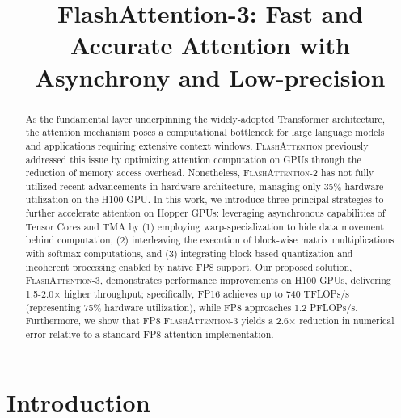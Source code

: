 \title{FlashAttention-3: Fast and Accurate Attention with Asynchrony and Low-precision}

\begin{abstract}
As the fundamental layer underpinning the widely-adopted Transformer architecture, the attention mechanism poses a computational bottleneck for large language models and applications requiring extensive context windows. \textsc{FlashAttention} previously addressed this issue by optimizing attention computation on GPUs through the reduction of memory access overhead. Nonetheless, \textsc{FlashAttention-2} has not fully utilized recent advancements in hardware architecture, managing only 35\% hardware utilization on the H100 GPU. In this work, we introduce three principal strategies to further accelerate attention on Hopper GPUs: leveraging asynchronous capabilities of Tensor Cores and TMA by (1) employing warp-specialization to hide data movement behind computation, (2) interleaving the execution of block-wise matrix multiplications with softmax computations, and (3) integrating block-based quantization and incoherent processing enabled by native FP8 support. Our proposed solution, \textsc{FlashAttention-3}, demonstrates performance improvements on H100 GPUs, delivering 1.5-2.0$\times$ higher throughput; specifically, FP16 achieves up to 740 TFLOPs/s (representing 75\% hardware utilization), while FP8 approaches 1.2 PFLOPs/s. Furthermore, we show that FP8 \textsc{FlashAttention-3} yields a 2.6$\times$ reduction in numerical error relative to a standard FP8 attention implementation.
\end{abstract}

\section{Introduction}
\label{sec:intro}

